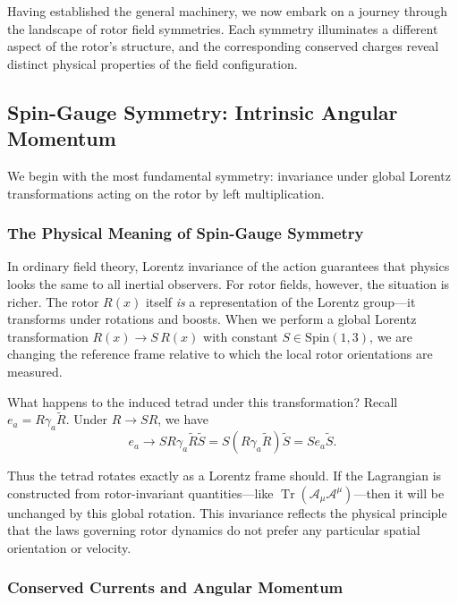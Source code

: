 \documentclass[11pt,a4paper]{article}
\numberwithin{equation}{section}
\theoremstyle{plain}
\theoremstyle{definition}
\theoremstyle{remark}
\DeclareMathOperator{\Tr}{Tr}
\begin{document}
Having established the general machinery, we now embark on a journey through the landscape of rotor field symmetries. Each symmetry illuminates a different aspect of the rotor's structure, and the corresponding conserved charges reveal distinct physical properties of the field configuration.

\subsection{Spin-Gauge Symmetry: Intrinsic Angular Momentum}

We begin with the most fundamental symmetry: invariance under global Lorentz transformations acting on the rotor by left multiplication.

\subsubsection{The Physical Meaning of Spin-Gauge Symmetry}

In ordinary field theory, Lorentz invariance of the action guarantees that physics looks the same to all inertial observers. For rotor fields, however, the situation is richer. The rotor $R(x)$ itself \emph{is} a representation of the Lorentz group---it transforms under rotations and boosts. When we perform a global Lorentz transformation $R(x) \to S\,R(x)$ with constant $S \in \mathrm{Spin}(1,3)$, we are changing the reference frame relative to which the local rotor orientations are measured.

What happens to the induced tetrad under this transformation? Recall $e_a = R\gamma_a\widetilde{R}$. Under $R \to SR$, we have
\begin{equation}
e_a \to SR\gamma_a\widetilde{R}\widetilde{S} = S(R\gamma_a\widetilde{R})\widetilde{S} = Se_a\widetilde{S}.
\end{equation}

Thus the tetrad rotates exactly as a Lorentz frame should. If the Lagrangian is constructed from rotor-invariant quantities---like $\Tr(\mathcal{A}_\mu\mathcal{A}^\mu)$---then it will be unchanged by this global rotation. This invariance reflects the physical principle that the laws governing rotor dynamics do not prefer any particular spatial orientation or velocity.

\subsubsection{Conserved Currents and Angular Momentum}
\end{document}
